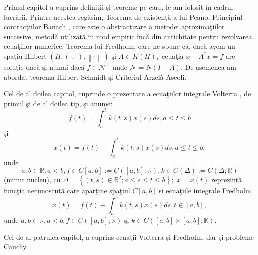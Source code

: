 \documentclass[a4paper,12pt,oneside]{report}
\begin{document}
Primul capitol a cuprins defini\c{t}ii \c{s}i teoreme pe care, le-am folosit \^{i}n cadrul lucr\u{a}rii. Printre acestea reg\u{a}sim, Teorema de existen\c{t}\u{a} a lui Peano, Principiul contrac\c{t}iilor Banach , care este o abstractizare a metodei aproxima\c{t}iilor succesive, metod\u{a} utilizat\u{a} \^{i}n mod empiric \^{i}nc\u{a} din antichitate pentru rezolvarea ecua\c{t}iilor numerice. Teorema lui Fredholm, care ne spune c\u{a}, dac\u{a} avem un spa\c{t}iu Hilbert \(\left ( H, \left ( \cdot ,\cdot  \right ), \left \| \cdot  \right \| \right )\)  \c{s}i  \(A \in K\left ( H \right ),\) ecua\c{t}ia \(x - A^{\ast }x = f\) are solu\c{t}ie dac\u{a} \c{s}i numai dac\u{a} \(f \in { \mathcal{N}} ^{\perp }\) unde \({ \mathcal{N}} = N\left ( I - A \right ). \)  De asemenea am abordat teorema Hilbert-Schmidt \c{s}i Criteriul Arzelà-Ascoli.

Cel de al doilea capitol, cuprinde o prezentare a ecua\c{t}iilor integrale  Volterra , de primul \c{s}i de al doilea tip, \c{s}i anume:
\begin{displaymath}
f\left ( t \right ) = \int_{a}^{t}k\left ( t,s \right )x\left ( s \right )ds,    a\leq t\leq b  
\end{displaymath}
\c{s}i
\begin{displaymath}
x\left ( t \right ) = f\left ( t \right ) + \int_{a}^{t}k\left ( t,s \right )x\left ( s \right )ds, a\leq t\leq b, 
\end{displaymath}
unde \[a,b \in \mathbb{R}, a< b, f\in C\left [ a,b \right ]:= C\left ( \left [ a,b \right ];\mathbb{R} \right ), k\in C\left (\Delta   \right ):= C\left ( \Delta ;\mathbb{R} \right )\] (numit nucleu), cu \(\Delta =\left \{ \left ( t,s \right )\in \mathbb{R}^{2};a\leq s\leq t\leq b \right \};\) \(x=x\left ( t \right )\) reprezint\u{a} func\c{t}ia necunoscut\u{a} care apar\c{t}ine spa\c{t}iul \(C\left [ a,b \right ]\)
si ecua\c{t}iile integrale  Fredholm
\begin{displaymath}
x\left ( t \right ) = f\left ( t \right ) + \int_{a}^{b}k\left ( t,s \right )x\left ( s \right )ds, t\in \left [ a,b \right ], 
\end{displaymath}
unde \(a,b \in \mathbb{R}, a< b, f\in C\left ( \left [ a,b \right ]; \mathbb{K}\right )\) \c{s}i \(k\in C\left ( \left [ a,b \right ] \times \left [ a,b \right ]; \mathbb{K}\right ).\)

Cel de al patrulea capitol, a cuprins ecua\c{t}ii Volterra \c{s}i Fredholm, dar \c{s}i probleme Cauchy. 



\setlength{\baselineskip}{\normalbaselineskip}
\setlength{\parskip}{0pt}

\end{document}
